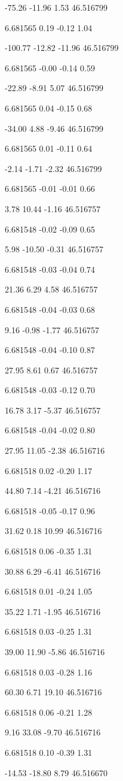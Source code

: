 -75.26
-11.96
1.53
46.516799

6.681565
0.19
-0.12
1.04

-100.77
-12.82
-11.96
46.516799

6.681565
-0.00
-0.14
0.59

-22.89
-8.91
5.07
46.516799

6.681565
0.04
-0.15
0.68

-34.00
4.88
-9.46
46.516799

6.681565
0.01
-0.11
0.64

-2.14
-1.71
-2.32
46.516799

6.681565
-0.01
-0.01
0.66

3.78
10.44
-1.16
46.516757

6.681548
-0.02
-0.09
0.65

5.98
-10.50
-0.31
46.516757

6.681548
-0.03
-0.04
0.74

21.36
6.29
4.58
46.516757

6.681548
-0.04
-0.03
0.68

9.16
-0.98
-1.77
46.516757

6.681548
-0.04
-0.10
0.87

27.95
8.61
0.67
46.516757

6.681548
-0.03
-0.12
0.70

16.78
3.17
-5.37
46.516757

6.681548
-0.04
-0.02
0.80

27.95
11.05
-2.38
46.516716

6.681518
0.02
-0.20
1.17

44.80
7.14
-4.21
46.516716

6.681518
-0.05
-0.17
0.96

31.62
0.18
10.99
46.516716

6.681518
0.06
-0.35
1.31

30.88
6.29
-6.41
46.516716

6.681518
0.01
-0.24
1.05

35.22
1.71
-1.95
46.516716

6.681518
0.03
-0.25
1.31

39.00
11.90
-5.86
46.516716

6.681518
0.03
-0.28
1.16

60.30
6.71
19.10
46.516716

6.681518
0.06
-0.21
1.28

9.16
33.08
-9.70
46.516716

6.681518
0.10
-0.39
1.31

-14.53
-18.80
8.79
46.516670


